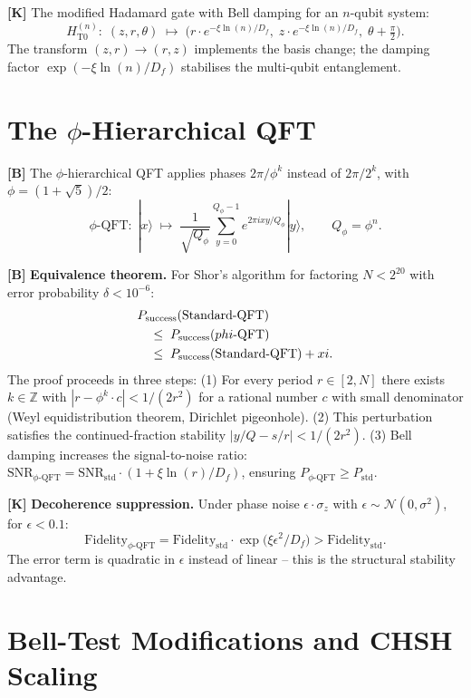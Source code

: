 \textbf{[K]} The modified Hadamard gate with Bell damping for an $n$-qubit system:
\[
  H_{\text{T0}}^{(n)}:\; (z,r,\theta)\;\mapsto\;
  \bigl(r\cdot e^{-\xi\ln(n)/D_f},\;z\cdot e^{-\xi\ln(n)/D_f},\;
  \theta+\tfrac\pi2\bigr).
\]
The transform $(z,r)\to(r,z)$ implements the basis change; the damping factor
$\exp(-\xi\ln(n)/D_f)$ stabilises the multi-qubit entanglement.

\section{The \texorpdfstring{$\phi$}{phi}-Hierarchical QFT}

\textbf{[B]} The $\phi$-hierarchical QFT applies phases $2\pi/\phi^k$ instead
of $2\pi/2^k$, with $\phi=(1+\sqrt5)/2$:
\[
  \phi\text{-QFT}:\;|x\rangle\;\mapsto\;
  \frac{1}{\sqrt{Q_\phi}}\sum_{y=0}^{Q_\phi-1} e^{2\pi i xy/Q_\phi}|y\rangle,
  \qquad Q_\phi=\phi^n.
\]

\textbf{[B]} \textbf{Equivalence theorem.} For Shor's algorithm for factoring
$N<2^{20}$ with error probability $\delta<10^{-6}$:
\begin{align}
  &P_{\text{success}}(\text{Standard-QFT}) \notag\\
  &\quad\le\;P_{\text{success}}(\phi\text{-QFT}) \notag\\
  &\quad\le\;P_{\text{success}}(\text{Standard-QFT}) + \xi. \notag
\end{align}
The proof proceeds in three steps: (1) For every period $r\in[2,N]$ there exists
$k\in\mathbb Z$ with $|r-\phi^k\cdot c|<1/(2r^2)$ for a rational number $c$ with
small denominator (Weyl equidistribution theorem, Dirichlet pigeonhole). (2) This
perturbation satisfies the continued-fraction stability
$|y/Q-s/r|<1/(2r^2)$. (3) Bell damping increases the signal-to-noise ratio:
$\text{SNR}_{\phi\text{-QFT}} = \text{SNR}_\text{std}\cdot(1+\xi\ln(r)/D_f)$,
ensuring $P_{\phi\text{-QFT}}\ge P_\text{std}$.

\textbf{[K]} \textbf{Decoherence suppression.} Under phase noise
$\epsilon\cdot\sigma_z$ with $\epsilon\sim\mathcal N(0,\sigma^2)$, for
$\epsilon<0{.}1$:
\[
  \text{Fidelity}_{\phi\text{-QFT}}
  = \text{Fidelity}_\text{std}\cdot\exp\!\bigl(\xi\epsilon^2/D_f\bigr)
  > \text{Fidelity}_\text{std}.
\]
The error term is quadratic in $\epsilon$ instead of linear -- this is the
structural stability advantage.

\section{Bell-Test Modifications and CHSH Scaling}

